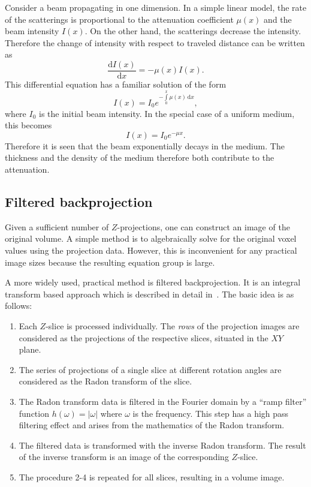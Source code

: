 \documentclass[a4paper,twoside,12pt]{article}
\begin{document}
Consider a beam propagating in one dimension. In a simple linear model, the rate of the scatterings is proportional to the attenuation coefficient $\mu(x)$ and the beam intensity $I(x)$. On the other hand, the scatterings decrease the intensity. Therefore the change of intensity with respect to traveled distance can be written as
\begin{equation}
    \label{eq:bl_ode}
    \frac{\mathrm{d}I(x)}{\mathrm{d}x} = -\mu (x) I (x).
\end{equation}
This differential equation has a familiar solution of the form
\begin{equation}
    \label{eq:bl}
    I(x) = I_0 e ^ { -\int\limits_0^x \mu(x)\,\mathrm{d}x },
\end{equation}
where $I_0$ is the initial beam intensity. In the special case of a uniform medium, this becomes
\begin{equation}
    \label{eq:bl_linear}
    I(x) = I_0 e ^ { -\mu x }.
\end{equation}
Therefore it is seen that the beam exponentially decays in the medium. The thickness and the density of the medium therefore both contribute to the attenuation.

\subsection{Filtered backprojection}
Given a sufficient number of $Z$-projections, one can construct an image of the original volume. A simple method is to algebraically solve for the original voxel values using the projection data. However, this is inconvenient for any practical image sizes because the resulting equation group is large.

A more widely used, practical method is filtered backprojection. It is an integral transform based approach which is described in detail in~\cite{radon}. The basic idea is as follows:
\begin{enumerate}
    \item Each $Z$-slice is processed individually. The \emph{rows} of the projection images are considered as the projections of the respective slices, situated in the $XY$ plane.

    \item The series of projections of a single slice at different rotation angles are considered as the Radon transform of the slice.

    \item The Radon transform data is filtered in the Fourier domain by a ``ramp filter'' function $h(\omega) = |\omega|$ where $\omega$ is the frequency. This step has a high pass filtering effect and arises from the mathematics of the Radon transform.

    \item The filtered data is transformed with the inverse Radon transform. The result of the inverse transform is an image of the corresponding $Z$-slice.

    \item The procedure 2-4 is repeated for all slices, resulting in a volume image.
\end{enumerate}
\end{document}
